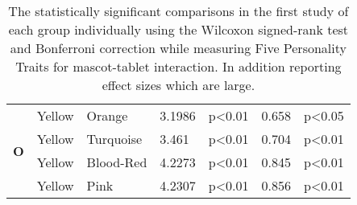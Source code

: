 \begin{table}
\begin{center}
\begin{tabular}{ |p{0.5cm}| p{1.9cm}|p{1.9cm}|p{1.2cm}| p{1.7cm}|p{1cm}|p{1.5cm}|  }
            \hline
            \hline
            \multirow{4}{*}{\textbf{O}}
            &Yellow &Orange &3.1986 &p<0.01 &0.658 &p<0.05\\
            &Yellow &Turquoise &3.461 &p<0.01 &0.704 &p<0.01\\
            &Yellow &Blood-Red &4.2273 &p<0.01 &0.845 &p<0.01\\
            &Yellow &Pink &4.2307 &p<0.01 &0.856 &p<0.01\\
            \hline
        \end{tabular}
    \end{center}
    \captionsetup{width=13.5cm}
    \caption{The statistically significant comparisons in the first study of each group individually using the Wilcoxon
    signed-rank test and Bonferroni correction while measuring Five Personality Traits for mascot-tablet interaction.
    In addition reporting effect sizes which are large.}
    \label{table:wilcoxMT1}
\end{table}

